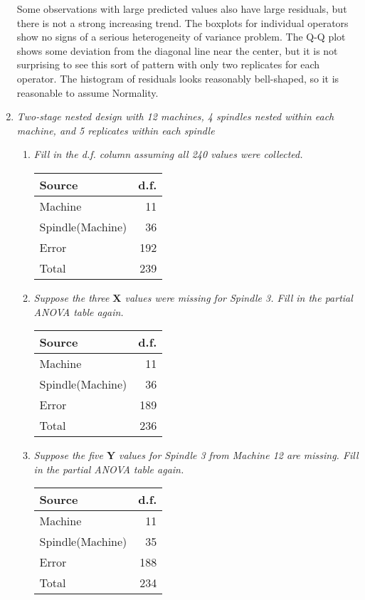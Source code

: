 \documentclass[11pt]{article}
\begin{document}
\begin{enumerate}
Some observations with large predicted values also have large residuals, but
there is not a strong increasing trend. The boxplots for individual operators
show no signs of a serious heterogeneity of variance problem. The Q-Q plot
shows some deviation from the diagonal line near the center, but it is not
surprising to see this sort of pattern with only two replicates for each
operator. The histogram of residuals looks reasonably bell-shaped, so it is
reasonable to assume Normality.

\pagebreak
\item %
{\it Two-stage nested design with 12 machines, 4 spindles nested within each
machine, and 5 replicates within each spindle}

\begin{enumerate}

\item %
{\it Fill in the d.f. column assuming all 240 values were collected.}

\begin{table}[H]\centering
\begin{tabular}{lr}
Source & d.f. \\
\hline
Machine & 11 \\
Spindle(Machine) & 36 \\
Error & 192 \\
\hline
Total & 239
\end{tabular}
\end{table}

\item %
{\it Suppose the three \(\mathbf{X}\) values were missing for Spindle 3. Fill
in the partial ANOVA table again.}

\begin{table}[H]\centering
\begin{tabular}{lr}
Source & d.f. \\
\hline
Machine & 11 \\
Spindle(Machine) & 36 \\
Error & 189 \\
\hline
Total & 236
\end{tabular}
\end{table}

\item %
{\it Suppose the five \(\mathbf{Y}\) values for Spindle 3 from Machine 12 are
missing. Fill in the partial ANOVA table again.}

\begin{table}[H]\centering
\begin{tabular}{lr}
Source & d.f. \\
\hline
Machine & 11 \\
Spindle(Machine) & 35 \\
Error & 188 \\
\hline
Total & 234
\end{tabular}
\end{table}


\end{enumerate}
\end{enumerate}
\end{document}
